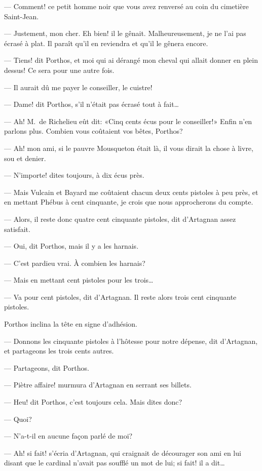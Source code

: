 — Comment! ce petit homme noir que vous avez renversé au coin du cimetière Saint-Jean.

— Justement, mon cher. Eh bien! il le gênait. Malheureusement, je ne l'ai pas écrasé à plat. Il paraît qu'il en reviendra et qu'il le gênera encore.

— Tiens! dit Porthos, et moi qui ai dérangé mon cheval qui allait donner en plein dessus! Ce sera pour une autre fois.

— Il aurait dû me payer le conseiller, le cuistre!

— Dame! dit Porthos, s'il n'était pas écrasé tout à fait\dots

— Ah! M.~de Richelieu eût dit: «Cinq cents écus pour le conseiller!» Enfin n'en parlons plus. Combien vous coûtaient vos bêtes, Porthos?

— Ah! mon ami, si le pauvre Mousqueton était là, il vous dirait la chose à livre, sou et denier.

— N'importe! dites toujours, à dix écus près.

— Mais Vulcain et Bayard me coûtaient chacun deux cents pistoles à peu près, et en mettant Phébus à cent cinquante, je crois que nous approcherons du compte.

— Alors, il reste donc quatre cent cinquante pistoles, dit d'Artagnan assez satisfait.

— Oui, dit Porthos, mais il y a les harnais.

— C'est pardieu vrai. À combien les harnais?

— Mais en mettant cent pistoles pour les trois\dots

— Va pour cent pistoles, dit d'Artagnan. Il reste alors trois cent cinquante pistoles.

Porthos inclina la tête en signe d'adhésion.

— Donnons les cinquante pistoles à l'hôtesse pour notre dépense, dit d'Artagnan, et partageons les trois cents autres.

— Partageons, dit Porthos.

— Piètre affaire! murmura d'Artagnan en serrant ses billets.

— Heu! dit Porthos, c'est toujours cela. Mais dites donc?

— Quoi?

— N'a-t-il en aucune façon parlé de moi?

— Ah! si fait! s'écria d'Artagnan, qui craignait de décourager son ami en lui disant que le cardinal n'avait pas soufflé un mot de lui; si fait! il a dit\dots

